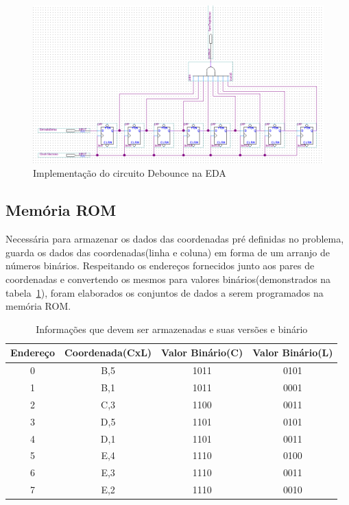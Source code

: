 \documentclass[12pt]{article}
\begin{document}
\begin{figure}[!htbp]
\centering
\includegraphics[width=.7\textwidth]{img/debounce.png}
\caption{Implementação do circuito Debounce na EDA}
\label{fig:debounce}
\end{figure}


\subsection{Memória ROM}

Necessária para armazenar os dados das coordenadas pré definidas no problema, guarda os dados das coordenadas(linha e coluna) em forma de um arranjo de números binários. Respeitando os endereços fornecidos junto aos pares de coordenadas e convertendo os mesmos para valores binários(demonstrados na tabela~\ref{tab:rom-memory}), foram elaborados os conjuntos de dados a serem programados na memória ROM.

\begin{table}[!htbp]
\centering
\begin{tabular}{||c||c||c||c||}
\hline 
\rule[-1ex]{0pt}{2.5ex} Endereço & Coordenada(CxL) & Valor Binário(C) & Valor Binário(L) \\ 
\hline 
\hline
\rule[-1ex]{0pt}{2.5ex} 0 & B,5 & 1011 & 0101 \\ 
\hline 
\rule[-1ex]{0pt}{2.5ex} 1 & B,1 & 1011 & 0001 \\ 
\hline 
\rule[-1ex]{0pt}{2.5ex} 2 & C,3 & 1100 & 0011 \\ 
\hline 
\rule[-1ex]{0pt}{2.5ex} 3 & D,5 & 1101 & 0101 \\ 
\hline 
\rule[-1ex]{0pt}{2.5ex} 4 & D,1 & 1101 & 0011 \\ 
\hline 
\rule[-1ex]{0pt}{2.5ex} 5 & E,4 & 1110 & 0100 \\ 
\hline 
\rule[-1ex]{0pt}{2.5ex} 6 & E,3 & 1110 & 0011 \\ 
\hline 
\rule[-1ex]{0pt}{2.5ex} 7 & E,2 & 1110 & 0010 \\ 
\hline 
\end{tabular} 
\caption{Informações que devem ser armazenadas e suas versões e binário}
\label{tab:rom-memory}
\end{table}
\end{document}
